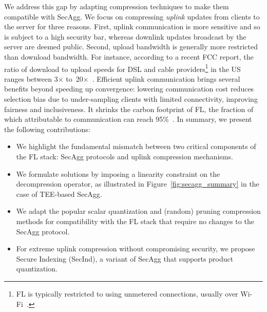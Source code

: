 \documentclass[11pt]{article}
\newcommand{\SecInd}{{\sc SecInd}\xspace}
\newcommand{\SecAgg}{{\sc SecAgg}\xspace}
\newcommand{\modif}[1]{{\color{black}#1}}
\begin{document}
We address this gap by adapting compression techniques to make them compatible with \SecAgg. We focus on compressing \emph{uplink} updates from clients to the server for three reasons.
First, uplink communication is more sensitive and so is subject to a high security bar, whereas downlink updates broadcast by the server are deemed public.
Second, upload bandwidth is generally more restricted than download bandwidth. For instance, according to
a recent FCC report,
the ratio of download to upload speeds for DSL and cable providers\footnote{FL is typically restricted to using unmetered connections, usually over Wi-Fi~\cite{Graham-huba2021papaya}.} in the US ranges between 3$\times$ to~20$\times$~\cite{Graham-fcc-broadband}.
Efficient uplink communication brings several benefits beyond speeding up convergence:
lowering communication cost reduces selection bias due to under-sampling clients with limited connectivity, improving fairness and inclusiveness.
It shrinks the carbon footprint of FL, the fraction of which attributable to communication can reach 95\%~\cite{Graham-qiu2021first}.
In summary, we present the following contributions:
\begin{itemize}
    \item We highlight the fundamental mismatch between two critical components of the FL stack: \SecAgg protocols and uplink compression mechanisms.

    \item We formulate solutions by imposing a linearity constraint on the decompression operator, as illustrated in Figure~\ref{fig:secagg_summary} in the case of TEE-based \SecAgg.

    \item We adapt the popular scalar quantization and (random) pruning compression methods for compatibility with the FL stack that require no changes to the \SecAgg protocol.

    \item For extreme uplink compression without compromising security, we propose Secure Indexing (\SecInd), a variant of \SecAgg that supports product quantization. %
\end{itemize}
\end{document}
